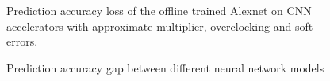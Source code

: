 \begin{figure}
    \caption{Prediction accuracy loss of the offline trained Alexnet on CNN accelerators with approximate multiplier, overclocking and soft errors.}
\label{fig:loss}
\vspace{-1em}
\end{figure}

\begin{figure}
    \caption{Prediction accuracy gap between different neural network models}
\label{fig:model-accuracy}
\vspace{-1em}
\end{figure}
